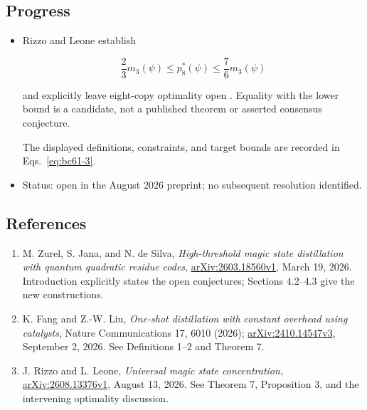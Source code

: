 \subsection*{Progress}

\begin{itemize}
  \item Rizzo and Leone establish

\begin{equation}
\frac23m_3(\psi)\leq p_8^*(\psi)\leq\frac76m_3(\psi)
\label{eq:bc61-3}
\end{equation}

and explicitly leave eight-copy optimality open . Equality with the lower bound is a candidate, not a published theorem or asserted consensus conjecture.

The displayed definitions, constraints, and target bounds are recorded in Eqs.~\eqref{eq:bc61-3}.

  \item Status: open in the August 2026 preprint; no subsequent resolution identified.
\end{itemize}

\subsection*{References}

\begin{enumerate}[label={},leftmargin=4.8em,labelsep=0.5em]
  \footnotesize
  \item[\textup{[Zurel26]}]\label{ref:bc61-zurel26}
  M. Zurel, S. Jana, and N. de Silva, \emph{High-threshold magic state distillation with quantum quadratic residue codes}, \href{https://arxiv.org/html/2603.18560v1}{arXiv:2603.18560v1}, March 19, 2026. Introduction explicitly states the open conjectures; Sections 4.2–4.3 give the new constructions.

  \item[\textup{[Fang26]}]\label{ref:bc61-fang26}
  K. Fang and Z.-W. Liu, \emph{One-shot distillation with constant overhead using catalysts}, Nature Communications 17, 6010 (2026); \href{https://arxiv.org/html/2410.14547v3}{arXiv:2410.14547v3}, September 2, 2026. See Definitions 1–2 and Theorem 7.

  \item[\textup{[Rizzo26]}]\label{ref:bc61-rizzo26}
  J. Rizzo and L. Leone, \emph{Universal magic state concentration}, \href{https://arxiv.org/html/2608.13376v1}{arXiv:2608.13376v1}, August 13, 2026. See Theorem 7, Proposition 3, and the intervening optimality discussion.
\end{enumerate}

